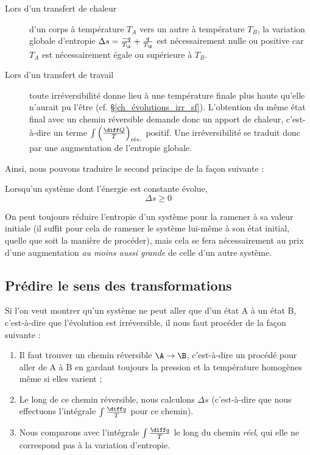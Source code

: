 		\begin{description}
			\item[Lors d’un transfert de chaleur] d’un corps à température $T_A$ vers un autre à température $T_B$, la variation globale d’entropie $\Delta s = \frac{-q}{T_\A} + \frac{q}{T_\B }$ est nécessairement nulle ou positive car $T_A$ est nécessairement égale ou supérieure à $T_B$.
			
			\item[Lors d’un transfert de travail] toute irréversibilité donne lieu à une température finale plus haute qu’elle n’aurait pu l’être (cf. \S\ref{ch_évolutions_irr_sf}). L’obtention du même état final avec un chemin réversible demande donc un apport de chaleur, c’est-à-dire un terme $\int \left(\frac{\diff Q}{T}\right)_\text{rév.}$ positif. Une irréversibilité se traduit donc par une augmentation de l’entropie globale.
			
		\end{description}

		Ainsi, nous pouvons traduire le second principe de la façon suivante :
			
		\begin{trucimportant}
			Lorsqu’un système dont l’énergie est constante évolue,
				\begin{equation}
					\Delta s \geqslant 0
					\label{eq_augmentation_entropie}
				\end{equation}
		\end{trucimportant}

		On peut toujours réduire l’entropie d’un système pour la ramener à sa valeur initiale (il suffit pour cela de ramener le système lui-même à son état initial, quelle que soit la manière de procéder), mais cela se fera nécessairement au prix d’une augmentation \emph{au moins aussi grande} de celle d’un autre système.

	\subsection{Prédire le sens des transformations}
	
		Si l’on veut montrer qu’un système ne peut aller que d’un état A à un état B, c’est-à-dire que l’évolution est irréversible, il nous faut procéder de la façon suivante :
	
		\begin{enumerate}
			\item Il faut trouver un chemin réversible $\A \to \B$, c’est-à-dire un procédé pour aller de A à B en gardant toujours la pression et la température homogènes même si elles varient ;
			\item Le long de ce chemin réversible, nous calculons $\Delta s$ (c’est-à-dire que nous effectuons l’intégrale $\int \frac{\diff q}{T} $ pour ce chemin).
			\item Nous comparons avec l’intégrale $\int \frac{\diff q}{T} $ le long du chemin \emph{réel}, qui elle ne correspond pas à la variation d’entropie.
		\end{enumerate}

